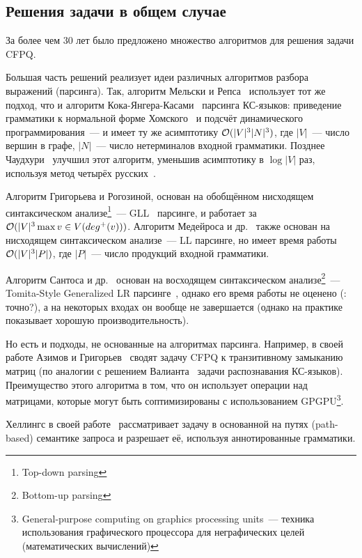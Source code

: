 \subsection{Решения задачи в общем случае}

За более чем 30 лет было предложено множество алгоритмов для решения задачи CFPQ. 

Большая часть решений реализует идеи различных алгоритмов разбора выражений (парсинга). Так, алгоритм Мельски и Репса~\cite{Reps97} использует тот же подход, что и алгоритм Кока-Янгера-Касами~\cite{Younger1967} парсинга КС-языков: приведение грамматики к нормальной форме Хомского~\cite{Chomsky1957} и подсчёт динамического программирования~--- и имеет ту же асимптотику $\mathcal{O}(|V|^3 |N|^3)$, где $|V|$~--- число вершин в графе, $|N|$~--- число нетерминалов входной грамматики. Позднее Чаудхури~\cite{Chaudhuri06} улучшил этот алгоритм, уменьшив асимптотику в $\log |V|$ раз, используя метод четырёх русских~\cite{Arlazarov70}.

Алгоритм Григорьева и Рогозиной, основан на обобщённом нисходящем синтаксическом анализе\footnote{Top-down parsing}~--- GLL~\cite{Scott10} парсинге, и работает за $\mathcal{O}(|V|^3 \max\limits{v \in V} (deg^{+}(v)))$. Алгоритм Медейроса и др.~\cite{Medeiros18} также основан на нисходящем синтаксическом анализе~--- LL парсинге, но имеет время работы $\mathcal{O}(|V|^3 |P|)$, где $|P|$~--- число продукций входной грамматики.

Алгоритм Сантоса и др.~\cite{Santos18} основан на восходящем синтаксическом анализе\footnote{Bottom-up parsing}~--- Tomita-Style Generalized LR парсинге~\cite{Scott00}, однако его время работы не оценено (\TODO: точно?), а на некоторых входах он вообще не завершается (однако на практике показывает хорошую производительность). 

Но есть и подходы, не основанные на алгоритмах парсинга. 
Например, в своей работе Азимов и Григорьев~\cite{Santos18} сводят задачу CFPQ к транзитивному замыканию матриц (по аналогии с решением Валианта~\cite{Valiant1975} задачи распознавания КС-языков). Преимущество этого алгоритма в том, что он использует операции над матрицами, которые могут быть соптимизированы с использованием GPGPU\footnote{General-purpose computing on graphics processing units~--- техника использования графического процессора для неграфических целей (математических вычислений)}.

Хеллингс в своей работе~\cite{Hellings15} рассматривает задачу в основанной на путях (path-based) семантике запроса и разрешает её, используя аннотированные грамматики.

